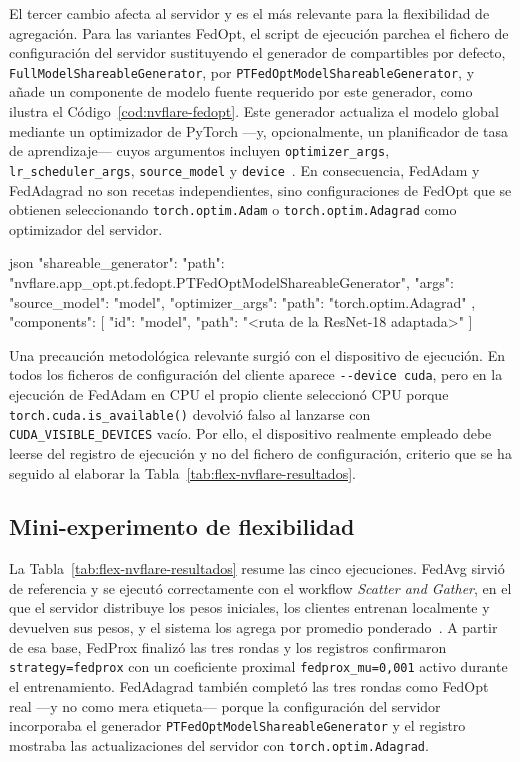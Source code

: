 El tercer cambio afecta al servidor y es el más relevante para la flexibilidad de
agregación. Para las variantes FedOpt, el script de ejecución parchea el fichero de
configuración del servidor sustituyendo el generador de compartibles por defecto,
\texttt{FullModelShareableGenerator}, por
\texttt{PTFedOptModelShareableGenerator}, y añade un componente de modelo
fuente requerido por este generador, como ilustra el
Código~\ref{cod:nvflare-fedopt}. Este generador actualiza el modelo global mediante
un optimizador de PyTorch —y, opcionalmente, un planificador de tasa de
aprendizaje— cuyos argumentos incluyen \texttt{optimizer\_args},
\texttt{lr\_scheduler\_args}, \texttt{source\_model} y
\texttt{device}~\parencite{nvflareFedopt}. En consecuencia, FedAdam y FedAdagrad no
son recetas independientes, sino configuraciones de FedOpt que se obtienen
seleccionando \texttt{torch.optim.Adam} o
\texttt{torch.optim.Adagrad} como optimizador del servidor.

\begin{codigo}[title={Fragmento representativo de config\_fed\_server.conf (FedOpt)}, label={cod:nvflare-fedopt}]{json}
"shareable_generator": {
  "path": "nvflare.app_opt.pt.fedopt.PTFedOptModelShareableGenerator",
  "args": {
    "source_model": "model",
    "optimizer_args": { "path": "torch.optim.Adagrad" }
  }
},
"components": [
  { "id": "model", "path": "<ruta de la ResNet-18 adaptada>" }
]
\end{codigo}

Una precaución metodológica relevante surgió con el dispositivo de ejecución. En
todos los ficheros de configuración del cliente aparece \texttt{-{}-device cuda},
pero en la ejecución de FedAdam en CPU el propio cliente seleccionó CPU porque
\texttt{torch.cuda.is_available()} devolvió falso al lanzarse con
\texttt{CUDA\_VISIBLE\_DEVICES} vacío. Por ello, el dispositivo realmente empleado
debe leerse del registro de ejecución y no del fichero de configuración, criterio
que se ha seguido al elaborar la Tabla~\ref{tab:flex-nvflare-resultados}.

\subsection{Mini-experimento de flexibilidad}\label{subsec:flex-nvflare-mini}

La Tabla~\ref{tab:flex-nvflare-resultados} resume las cinco ejecuciones. FedAvg
sirvió de referencia y se ejecutó correctamente con el workflow \textit{Scatter and
Gather}, en el que el servidor distribuye los pesos iniciales, los clientes
entrenan localmente y devuelven sus pesos, y el sistema los agrega por promedio
ponderado~\parencite{nvflareAlgorithms}. A partir de esa base, FedProx finalizó las
tres rondas y los registros confirmaron \texttt{strategy=fedprox} con un coeficiente
proximal \texttt{fedprox\_mu=0,001} activo durante el entrenamiento. FedAdagrad
también completó las tres rondas como FedOpt real —y no como mera etiqueta— porque
la configuración del servidor incorporaba el generador
\texttt{PTFedOptModelShareableGenerator} y el registro mostraba las
actualizaciones del servidor con \texttt{torch.optim.Adagrad}.

